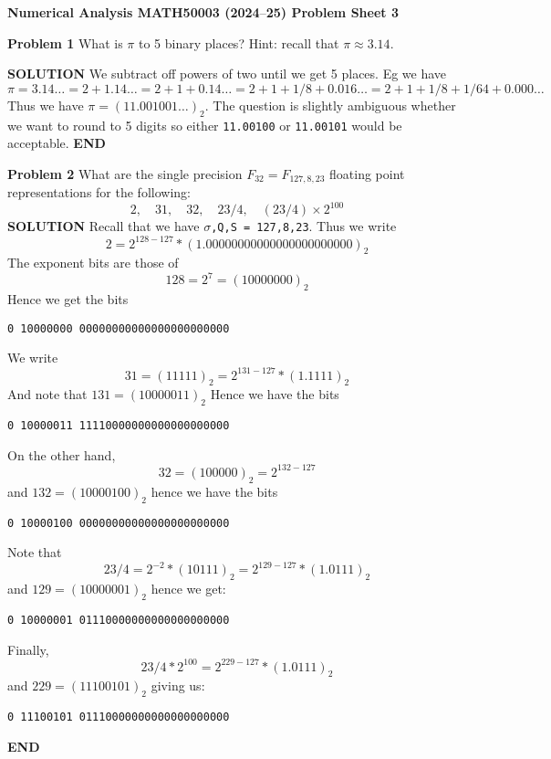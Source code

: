 \documentclass[12pt,a4paper]{article}
\def\endash{–}
\begin{document}
\textbf{Numerical Analysis MATH50003 (2024\ensuremath{\endash}25) Problem Sheet 3}

\textbf{Problem 1} What is $\ensuremath{\pi}$ to 5 binary places? Hint: recall that $\ensuremath{\pi} \ensuremath{\approx} 3.14$.

\textbf{SOLUTION} We subtract off powers of two until we get 5 places. Eg we have
\[
\ensuremath{\pi} = 3.14\ensuremath{\ldots} = 2 + 1.14\ensuremath{\ldots} = 2 + 1 + 0.14\ensuremath{\ldots} = 2 + 1 + 1/8 + 0.016\ensuremath{\ldots} = 2 + 1 + 1/8  + 1/64  + 0.000\ensuremath{\ldots}
\]
Thus we have $\ensuremath{\pi} = (11.001001\ensuremath{\ldots})_2$. The question is slightly ambiguous whether we want to round to 5 digits so either \texttt{11.00100} or \texttt{11.00101} would be acceptable. \textbf{END}

\textbf{Problem 2} What are the single precision $F_{32} = F_{127,8,23}$ floating point representations for the following: 
\[
2, \quad 31, \quad 32, \quad 23/4, \quad (23/4)\times 2^{100}
\]
\textbf{SOLUTION} Recall that we have \texttt{\ensuremath{\sigma},Q,S = 127,8,23}. Thus we write
\[
2 = 2^{128-127} * (1.00000000000000000000000)_2
\]
The exponent bits are those of
\[
128 = 2^7 = (10000000)_2
\]
Hence we get the bits 

\begin{verbatim}
0 10000000 00000000000000000000000
\end{verbatim}
We write
\[
31 = (11111)_2 = 2^{131-127} * (1.1111)_2
\]
And note that $131 = (10000011)_2$ Hence we have the bits

\begin{verbatim}
0 10000011 11110000000000000000000
\end{verbatim}
On the other hand,
\[
32 = (100000)_2 = 2^{132-127}
\]
and $132 = (10000100)_2$ hence we have the bits 

\begin{verbatim}
0 10000100 00000000000000000000000
\end{verbatim}
Note that
\[
23/4 = 2^{-2} * (10111)_2 = 2^{129-127} * (1.0111)_2
\]
and $129 = (10000001)_2$ hence we get:

\begin{verbatim}
0 10000001 01110000000000000000000
\end{verbatim}
Finally,
\[
23/4 * 2^{100} = 2^{229-127} * (1.0111)_2
\]
and $229 = (11100101)_2$ giving us:

\begin{verbatim}
0 11100101 01110000000000000000000
\end{verbatim}
\textbf{END}
\end{document}
